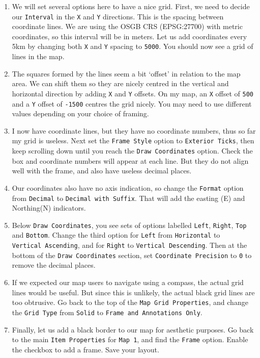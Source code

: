 \documentclass[
  letterpaper,
  DIV=11,
  numbers=noendperiod]{scrreprt}
\begin{document}
\begin{enumerate}
\def\labelenumi{(\arabic{enumi})}
\setcounter{enumi}{255}
\item
  We will set several options here to have a nice grid. First, we need
  to decide our \texttt{Interval} in the \texttt{X} and \texttt{Y}
  directions. This is the spacing between coordinate lines. We are using
  the OSGB CRS (EPSG:27700) with metric coordinates, so this interval
  will be in meters. Let us add coordinates every 5km by changing both
  \texttt{X} and \texttt{Y} spacing to \texttt{5000}. You should now see
  a grid of lines in the map.
\item
  The squares formed by the lines seem a bit `offset' in relation to the
  map area. We can shift them so they are nicely centred in the vertical
  and horizontal direction by adding \texttt{X} and \texttt{Y} offsets.
  On my map, an \texttt{X} offset of \texttt{500} and a \texttt{Y}
  offset of \texttt{-1500} centres the grid nicely. You may need to use
  different values depending on your choice of framing.
\item
  I now have coordinate lines, but they have no coordinate numbers, thus
  so far my grid is useless. Next set the \texttt{Frame\ Style} option
  to \texttt{Exterior\ Ticks}, then keep scrolling down until you reach
  the \texttt{Draw\ Coordinates} option. Check the box and coordinate
  numbers will appear at each line. But they do not align well with the
  frame, and also have useless decimal places.
\item
  Our coordinates also have no axis indication, so change the
  \texttt{Format} option from \texttt{Decimal} to
  \texttt{Decimal\ with\ Suffix}. That will add the easting (E) and
  Northing(N) indicators.
\item
  Below \texttt{Draw\ Coordinates}, you see sets of options labelled
  \texttt{Left}, \texttt{Right}, \texttt{Top} and \texttt{Bottom}.
  Change the third option for \texttt{Left} from \texttt{Horizontal} to
  \texttt{Vertical\ Ascending}, and for \texttt{Right} to
  \texttt{Vertical\ Descending}. Then at the bottom of the
  \texttt{Draw\ Coordinates} section, set \texttt{Coordinate\ Precision}
  to \texttt{0} to remove the decimal places.
\item
  If we expected our map users to navigate using a compass, the actual
  grid lines would be useful. But since this is unlikely, the actual
  black grid lines are too obtrusive. Go back to the top of the
  \texttt{Map\ Grid\ Properties}, and change the \texttt{Grid\ Type}
  from \texttt{Solid} to \texttt{Frame\ and\ Annotations\ Only}.
\item
  Finally, let us add a black border to our map for aesthetic purposes.
  Go back to the main \texttt{Item\ Properties} for \texttt{Map\ 1}, and
  find the \texttt{Frame} option. Enable the checkbox to add a frame.
  Save your layout.
\end{enumerate}
\end{document}
